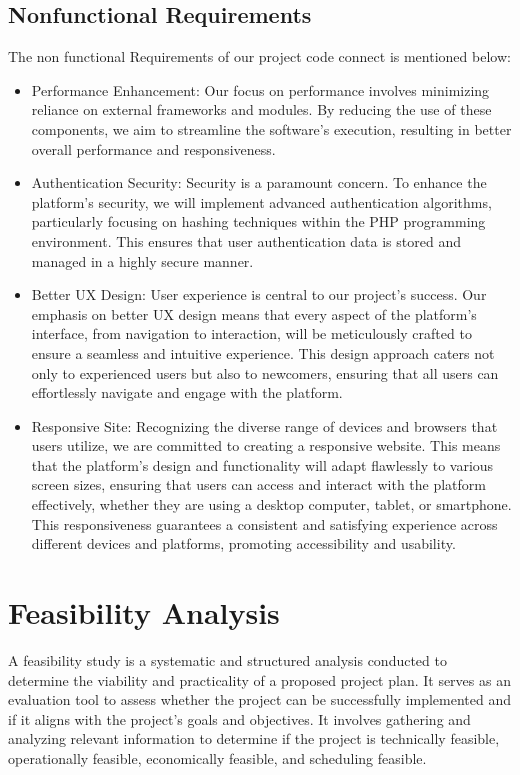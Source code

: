 \subsection{Nonfunctional Requirements}
The non functional Requirements of our project code connect is mentioned below:
\begin{itemize}
    \item Performance Enhancement: Our focus on performance involves minimizing reliance on external frameworks and modules. By reducing the use of these components, we aim to streamline the software's execution, resulting in better overall performance and responsiveness.
    \item Authentication Security: Security is a paramount concern. To enhance the platform's security, we will implement advanced authentication algorithms, particularly focusing on hashing techniques within the PHP programming environment. This ensures that user authentication data is stored and managed in a highly secure manner.
    \item Better UX Design: User experience is central to our project's success. Our emphasis on better UX design means that every aspect of the platform's interface, from navigation to interaction, will be meticulously crafted to ensure a seamless and intuitive experience. This design approach caters not only to experienced users but also to newcomers, ensuring that all users can effortlessly navigate and engage with the platform.
    \item Responsive Site: Recognizing the diverse range of devices and browsers that users utilize, we are committed to creating a responsive website. This means that the platform's design and functionality will adapt flawlessly to various screen sizes, ensuring that users can access and interact with the platform effectively, whether they are using a desktop computer, tablet, or smartphone. This responsiveness guarantees a consistent and satisfying experience across different devices and platforms, promoting accessibility and usability.
    
  \end{itemize}
\section{Feasibility Analysis}
A feasibility study is a systematic and structured analysis conducted to determine the viability and practicality of a proposed project plan. It serves as an evaluation tool to assess whether the project can be successfully implemented and if it aligns with the project's goals and objectives. It involves gathering and analyzing relevant information to determine if the project is technically feasible, operationally feasible, economically feasible, and scheduling feasible.
